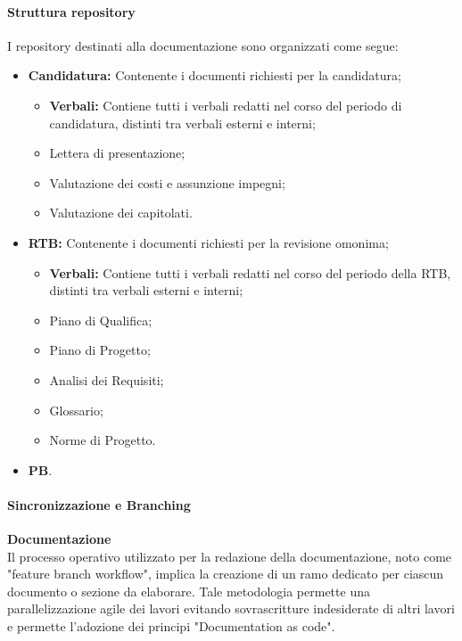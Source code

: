 \paragraph{Struttura repository}
I repository destinati alla documentazione sono organizzati come segue:
\begin{itemize}
    \item \textbf{Candidatura:} Contenente i documenti richiesti per la candidatura;
          \begin{itemize}
              \item \textbf{Verbali:} Contiene tutti i verbali redatti nel corso del periodo di candidatura, distinti tra verbali esterni e interni;
              \item Lettera di presentazione;
              \item Valutazione dei costi e assunzione impegni;
              \item Valutazione dei capitolati.
          \end{itemize}
    \item \textbf{RTB:} Contenente i documenti richiesti per la revisione omonima;
          \begin{itemize}
              \item \textbf{Verbali:} Contiene tutti i verbali redatti nel corso del periodo della RTB, distinti tra verbali esterni e interni;
              \item Piano di Qualifica;
              \item Piano di Progetto;
              \item Analisi dei Requisiti;
              \item Glossario;
              \item Norme di Progetto.
          \end{itemize}
    \item \textbf{PB}.
\end{itemize}


\paragraph{Sincronizzazione e Branching}
\textbf{Documentazione} \\
Il processo operativo utilizzato per la redazione della documentazione, noto come "feature branch workflow", implica la creazione di un ramo dedicato per ciascun documento o sezione da elaborare.
Tale metodologia permette una parallelizzazione agile dei lavori evitando sovrascritture indesiderate di altri lavori e permette l'adozione dei principi "Documentation as code". \\ %

